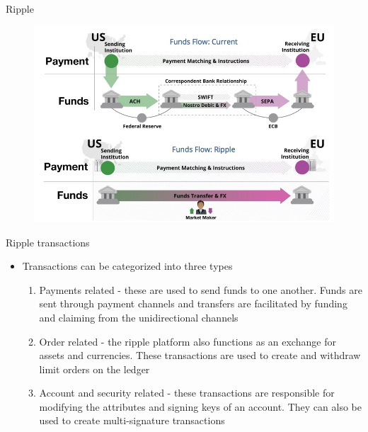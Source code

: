 \documentclass[10pt]{beamer}
\begin{document}

\begin{frame}{Ripple}
	\begin{figure}[]
		\centering
		\includegraphics  [scale=0.3]{Images/ripple}
	\end{figure}
\end{frame}


\begin{frame}{Ripple transactions}
	\begin{itemize}
		\item Transactions can be categorized into three types
		\begin{enumerate}
			\item Payments related - these are used to send funds to one another. Funds are sent through payment channels and transfers are facilitated by funding and claiming from the unidirectional channels
			\item Order related - the ripple platform also functions as an exchange for assets and currencies. These transactions are used to create and withdraw limit orders on the ledger
			\item Account and security related - these transactions are responsible for modifying the attributes and signing keys of an account. They can also be used to create multi-signature transactions
		\end{enumerate}
	\end{itemize}
\end{frame}

\end{document}

